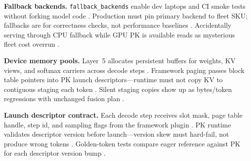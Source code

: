 \textbf{Fallback backends.} \texttt{fallback\_backends} enable dev laptops and CI smoke tests without forking model code \citep{yirage2026,chen2020compilerbasedhardw,patel2025llminference,amd2024aie,amd2024xdna,dlbook,taxbreak2026,memoryfloor2026,kwon2023vllm,liu2024deepseekv3,nvidia2024cudagraphs,dao2022flashattention,semianalysis2024tma,dao2023flashdecoding,nvidia2022hopper,dlbook}. Production must pin primary backend to fleet SKU; fallbacks are for correctness checks, not performance baselines \citep{yirage2026,chen2020compilerbasedhardw,patel2025llminference,taxbreak2026,memoryfloor2026,dlbook}. Accidentally serving through CPU fallback while GPU PK is available reads as mysterious fleet cost overrun \citep{patel2025llminference,yirage2026,chen2020compilerbasedhardw,kwon2023vllm,taxbreak2026,memoryfloor2026,dlbook}.

\textbf{Device memory pools.} Layer~5 allocates persistent buffers for weights, KV views, and softmax carriers across decode steps \citep{yirage2026,chen2020compilerbasedhardw,dao2022flashattention,memoryfloor2026,taxbreak2026,patel2025llminference,kwon2023vllm,liu2024deepseekv3,nvidia2024cudagraphs,semianalysis2024tma,amd2024xdna,amd2024aie,dao2023flashdecoding,nvidia2022hopper,dlbook}. Framework paging passes block table pointers into PK launch descriptors---runtime must not copy KV to contiguous staging each token \citep{kwon2023vllm,yirage2026,chen2020compilerbasedhardw,patel2025llminference,memoryfloor2026,taxbreak2026,dao2022flashattention,dlbook}. Silent staging copies show up as bytes/token regressions with unchanged fusion plan \citep{memoryfloor2026,taxbreak2026,yirage2026,chen2020compilerbasedhardw,patel2025llminference,kwon2023vllm,dlbook}.

\textbf{Launch descriptor contract.} Each decode step receives slot mask, page table handle, step id, and sampling flags from the framework plugin \citep{kwon2023vllm,yirage2026,chen2020compilerbasedhardw,patel2025llminference,nvidia2024cudagraphs,memoryfloor2026,taxbreak2026,dao2022flashattention,liu2024deepseekv3,semianalysis2024tma,amd2024xdna,amd2024aie,dao2023flashdecoding,nvidia2022hopper,dlbook}. PK runtime validates descriptor version before launch---version skew must hard-fail, not produce wrong tokens \citep{yirage2026,chen2020compilerbasedhardw,kwon2023vllm,patel2025llminference,memoryfloor2026,taxbreak2026,dlbook}. Golden-token tests compare eager reference against PK for each descriptor version bump \citep{patel2025llminference,yirage2026,chen2020compilerbasedhardw,dao2022flashattention,kwon2023vllm,memoryfloor2026,taxbreak2026,nvidia2024cudagraphs,dlbook}.

